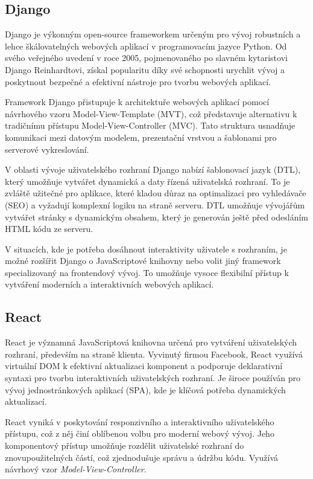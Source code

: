 \subsection{Django}
\label{subsec:dev-framework-django}
Django je výkonným open-source frameworkem určeným pro vývoj robustních a lehce škálovatelných webových aplikací v programovacím jazyce Python. Od svého veřejného uvedení v roce 2005, pojmenovaného po slavném kytaristovi Django Reinhardtovi, získal popularitu díky své schopnosti urychlit vývoj a poskytnout bezpečné a efektivní nástroje pro tvorbu webových aplikací.

Framework Django přistupuje k architektuře webových aplikací pomocí návrhového vzoru Model-View-Template (MVT), což představuje alternativu k tradičnímu přístupu Model-View-Controller (MVC). Tato struktura usnadňuje komunikaci mezi datovým modelem, prezentační vrstvou a šablonami pro serverové vykreslování.

V oblasti vývoje uživatelského rozhraní Django nabízí šablonovací jazyk (DTL), který umožňuje vytvářet dynamická a daty řízená uživatelská rozhraní. To je zvláště užitečné pro aplikace, které kladou důraz na optimalizaci pro vyhledávače (SEO) a vyžadují komplexní logiku na straně serveru. DTL umožňuje vývojářům vytvářet stránky s dynamickým obsahem, který je generován ještě před odesláním HTML kódu ze serveru.

V situacích, kde je potřeba dosáhnout interaktivity uživatele s rozhraním, je možné rozšířit Django o JavaScriptové knihovny nebo volit jiný framework specializovaný na frontendový vývoj. To umožňuje vysoce flexibilní přístup k vytváření moderních a interaktivních webových aplikací. \cite{about_django}

\subsection{React}
\label{subsec:dev-framework-react}
React je významná JavaScriptová knihovna určená pro vytváření uživatelských rozhraní, především na straně klienta. Vyvinutý firmou Facebook, React využívá virtuální DOM k efektivní aktualizaci komponent a podporuje deklarativní syntaxi pro tvorbu interaktivních uživatelských rozhraní. Je široce používán pro vývoj jednostránkových aplikací (SPA), kde je klíčová potřeba dynamických aktualizací.

React vyniká v poskytování responzivního a interaktivního uživatelského přístupu, což z něj činí oblíbenou volbu pro moderní webový vývoj. Jeho komponentový přístup umožňuje rozdělit uživatelské rozhraní do znovupoužitelných částí, což zjednodušuje správu a údržbu kódu. Využívá návrhový vzor \textit{Model-View-Controller}. \cite{about_react}

